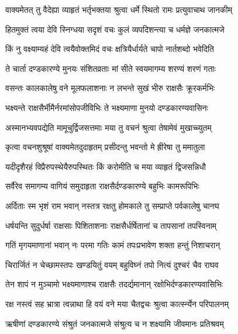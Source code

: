 
\twolineshloka
{वाक्यमेतत् तु वैदेह्या व्याहृतं भर्तृभक्तया}
{श्रुत्वा धर्मे स्थितो रामः प्रत्युवाचाथ जानकीम्} %

\twolineshloka
{हितमुक्तं त्वया देवि स्निग्धया सदृशं वचः}
{कुलं व्यपदिशन्त्या च धर्मज्ञे जनकात्मजे} %

\twolineshloka
{किं नु वक्ष्याम्यहं देवि त्वयैवोक्तमिदं वचः}
{क्षत्रियैर्धार्यते चापो नार्तशब्दो भवेदिति} %

\twolineshloka
{ते चार्ता दण्डकारण्ये मुनयः संशितव्रताः}
{मां सीते स्वयमागम्य शरण्यं शरणं गताः} %

\twolineshloka
{वसन्तः कालकालेषु वने मूलफलाशनाः}
{न लभन्ते सुखं भीरु राक्षसैः क्रूरकर्मभिः} %

\twolineshloka
{भक्ष्यन्ते राक्षसैर्भीमैर्नरमांसोपजीविभिः}
{ते भक्ष्यमाणा मुनयो दण्डकारण्यवासिनः} %

\twolineshloka
{अस्मानभ्यवपद्येति मामूचुर्द्विजसत्तमाः}
{मया तु वचनं श्रुत्वा तेषामेवं मुखाच्च्युतम्} %

\twolineshloka
{कृत्वा वचनशुश्रूषां वाक्यमेतदुदाहृतम्}
{प्रसीदन्तु भवन्तो मे ह्रीरेषा तु ममातुला} %

\twolineshloka
{यदीदृशैरहं विप्रैरुपस्थेयैरुपस्थितः}
{किं करोमीति च मया व्याहृतं द्विजसन्निधौ} %

\twolineshloka
{सर्वैरेव समागम्य वागियं समुदाहृता}
{राक्षसैर्दण्डकारण्ये बहुभिः कामरूपिभिः} %

\twolineshloka
{अर्दिताः स्म भृशं राम भवान् नस्तत्र रक्षतु}
{होमकाले तु सम्प्राप्ते पर्वकालेषु चानघ} %

\twolineshloka
{धर्षयन्ति सुदुर्धर्षा राक्षसाः पिशिताशनाः}
{राक्षसैर्धर्षितानां च तापसानां तपस्विनाम्} %

\twolineshloka
{गतिं मृगयमाणानां भवान् नः परमा गतिः}
{कामं तपःप्रभावेण शक्ता हन्तुं निशाचरान्} %

\twolineshloka
{चिरार्जितं न चेच्छामस्तपः खण्डयितुं वयम्}
{बहुविघ्नं तपो नित्यं दुश्चरं चैव राघव} %

\twolineshloka
{तेन शापं न मुञ्चामो भक्ष्यमाणाश्च राक्षसैः}
{तदर्द्यमानान् रक्षोभिर्दण्डकारण्यवासिभिः} %

\twolineshloka
{रक्ष नस्त्वं सह भ्रात्रा त्वन्नाथा हि वयं वने}
{मया चैतद्वचः श्रुत्वा कार्त्स्न्येन परिपालनम्} %

\twolineshloka
{ऋषीणां दण्डकारण्ये संश्रुतं जनकात्मजे}
{संश्रुत्य च न शक्ष्यामि जीवमानः प्रतिश्रवम्} %


